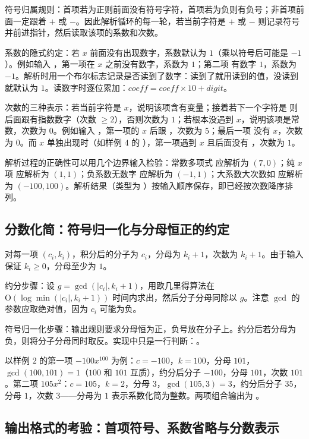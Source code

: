 符号归属规则：首项若为正则前面没有符号字符，首项若为负则有负号；非首项前面一定跟着 $+$ 或 $-$。因此解析循环的每一轮，若当前字符是 $+$ 或 $-$ 则记录符号并前进指针，然后读取该项的系数和次数。

系数的隐式约定：若 $x$ 前面没有出现数字，系数默认为 $1$（乘以符号后可能是 $-1$）。例如输入 ，第一项在 $x$ 之前没有数字，系数为 $1$；第二项  有数字 $1$，系数为 $-1$。解析时用一个布尔标志记录是否读到了数字：读到了就用读到的值，没读到就默认为 $1$。读数字时逐位累加：$\textit{coeff} = \textit{coeff} \times 10 + \textit{digit}$。

次数的三种表示：若当前字符是 $x$，说明该项含有变量；接着若下一个字符是 \mil{^} 则后面跟有指数数字（次数 $\ge 2$），否则次数为 $1$；若根本没遇到 $x$，说明该项是常数，次数为 $0$。例如输入 ，第一项的 $x$ 后跟 ，次数为 $5$；最后一项  没有 $x$，次数为 $0$。而 $x$ 单独出现时（如样例 $4$ 的 ），第一项遇到 $x$ 且后面没有 \mil{^}，次数为 $1$。

解析过程的正确性可以用几个边界输入检验：常数多项式  应解析为 $(7,0)$；纯 $x$ 项  应解析为 $(1,1)$；负系数无数字  应解析为 $(-1,1)$；大系数大次数如  应解析为 $(-100,100)$。解析结果（类型为 ）按输入顺序保存，即已经按次数降序排列。

\subsection{分数化简：符号归一化与分母恒正的约定}

对每一项 $(c_i, k_i)$，积分后的分子为 $c_i$，分母为 $k_i+1$，次数为 $k_i+1$。由于输入保证 $k_i \ge 0$，分母至少为 $1$。

约分步骤：设 $g = \gcd(|c_i|, k_i+1)$，用欧几里得算法在 $\mathrm{O}(\log \min(|c_i|, k_i+1))$ 时间内求出，然后分子分母同除以 $g$。注意 $\gcd$ 的参数应取绝对值，因为 $c_i$ 可能为负。

符号归一化步骤：输出规则要求分母恒为正，负号放在分子上。约分后若分母为负，则将分子分母同时取反。实现中只是一行判断：。

以样例 $2$ 的第一项 $-100x^{100}$ 为例：$c = -100$，$k = 100$，分母 $101$，$\gcd(100, 101) = 1$（$100$ 和 $101$ 互质），约分后分子 $-100$，分母 $101$，次数 $101$。第二项 $105x^2$：$c=105$，$k=2$，分母 $3$，$\gcd(105,3)=3$，约分后分子 $35$，分母 $1$，次数 $3$——分母为 $1$ 表示系数化简为整数。两项组合输出为 。

\subsection{输出格式的考验：首项符号、系数省略与分数表示}

